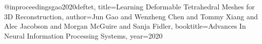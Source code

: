 @inproceedings{gao2020deftet,
title={Learning Deformable Tetrahedral Meshes for 3D Reconstruction},
author={Jun Gao and Wenzheng Chen and Tommy Xiang and Alec Jacobson and Morgan McGuire and Sanja Fidler},
booktitle={Advances In Neural Information Processing Systems},
year={2020}
}